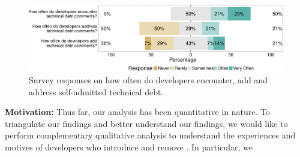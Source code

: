 





\begin{figure}[!tb]
	\centering
	\includegraphics[width=\columnwidth]{figures/test/responses_question.pdf}
	\caption{Survey responses on how often do developers encounter, add and address self-admitted technical debt.}
	\label{fig:encouner_add_address}
\end{figure}


 \noindent\rqiv

\noindent \textbf{Motivation:} 
Thus far, our analysis has been quantitative in nature. To triangulate our findings and better understand our findings, we would like to perform complementary qualitative analysis to understand the experiences and motives of developers who introduce and remove \SATD. In particular, we 


